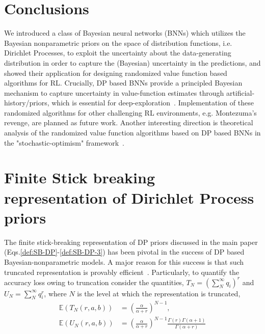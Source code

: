 \documentclass[10pt]{article}
\def\E{\mathbb{E}}
\begin{document}
\section{Conclusions}
\label{sec:conclusions}

We introduced a class of Bayesian neural networks (BNNs) which utilizes the Bayesian nonparametric priors on the space of distribution functions, i.e. Dirichlet Processes, to exploit the uncertainty about the data-generating distribution in order to capture the (Bayesian) uncertainty in the predictions, and showed their application for designing randomized value function based algorithms for RL. Crucially, DP based BNNs  provide a principled Bayesian mechanism to capture uncertainty in value-function estimates through artificial-history/priors, which is essential for deep-exploration~\citep{osband2018randomized}. Implementation of these randomized algorithms for other challenging RL environments, e.g. Montezuma's revenge, are planned as future work. Another interesting direction is theoretical analysis of the randomized value function algorithms based on DP based BNNs in the "stochastic-optimism" framework~\citep{osband2017posterior}. 









\appendix





\section{Finite Stick breaking representation of Dirichlet Process priors}
\label{sec:stick-breaking-finite}

The finite stick-breaking representation of DP priors discussed in the main paper (Eqs.\ref{def:SB-DP}-\ref{def:SB-DP-3}) has been pivotal in the success of DP based Bayesian-nonparametric models. A major reason for this success is that such truncated representation is provably efficient~\citep{ishwaran2001gibbs}. Particularly, to quantify the accuracy loss owing to truncation consider the quantities, $T_{N} = (\sum_{N}^{\infty} q_{i})^{r}$ and $U_{N} = \sum_{N}^{\infty} q_{i}^{r}$, where $N$ is the level at which the representation is truncated,
\begin{align}
\E(T_{N}(r,a,b)) &= \left(\frac{\alpha}{\alpha+r}\right)^{N-1} ,\\
\E(U_{N}(r,a,b)) &= \left(\frac{\alpha}{\alpha+r}\right)^{N-1} \frac{\Gamma(r)\Gamma(\alpha + 1)}{\Gamma (\alpha + r)} 
\end{align}
\end{document}
